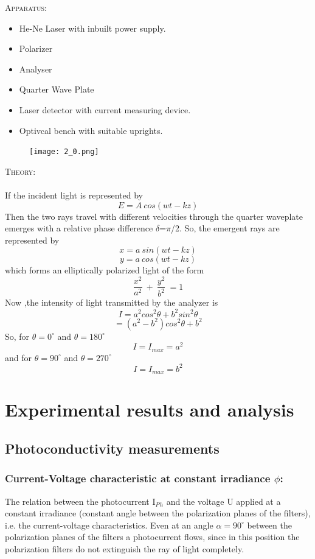 \documentclass[12pt]{report}
\begin{document}
\textsc{\large{Apparatus: }}
\begin{itemize}
	\item He-Ne Laser with inbuilt power supply.
	\item Polarizer
	\item Analyser
	\item Quarter Wave Plate
	\item Laser detector with current measuring device.
	\item Optivcal bench with suitable uprights.
\end{itemize}
\begin{figure}[h!]
	\centering
	\texttt{[image: 2\_0.png]}
\end{figure}
\textsc{\large{Theory:}}
\\
\\
If the incident light is represented by
\[E = A\: cos(wt-kz)\]
Then the two rays travel with different velocities through the quarter waveplate emerges with a relative phase difference $\delta$=$\pi$/2. So, the emergent rays are represented by 
\[x=a\: sin(wt-kz)\]
\[y=a\: cos(wt-kz)\]
which forms an elliptically polarized light of the form
\[\frac{x^2}{a^2}\: +\: \frac{y^2}{b^2}\:=1 \]
Now ,the intensity of light transmitted by the analyzer is
\[I=a^2cos^2{\theta}+b^2sin^2{\theta}\]
\[=(a^2-b^2)cos^2{\theta}+b^2\]
So, for $\theta = 0^\circ$ and $\theta=180^\circ$
\[I=I_{max}=a^2\]
and for $\theta=90^\circ$ and $\theta=270^\circ$
\[I=I_{max}=b^2\]
\newpage

\chapter{Experimental results and analysis}

\section{Photoconductivity measurements}    
\subsection{Current-Voltage characteristic at constant irradiance $\phi$:}

The relation between the photocurrent I$_P$$_h$ and the voltage U applied at a constant irradiance
(constant angle between the polarization planes of the filters), i.e. the current-voltage
characteristics. Even at an angle $\alpha = 90^\circ$ between the polarization planes of
the filters a photocurrent flows, since in this position the polarization filters do not extinguish the ray of light completely.
\end{document}

